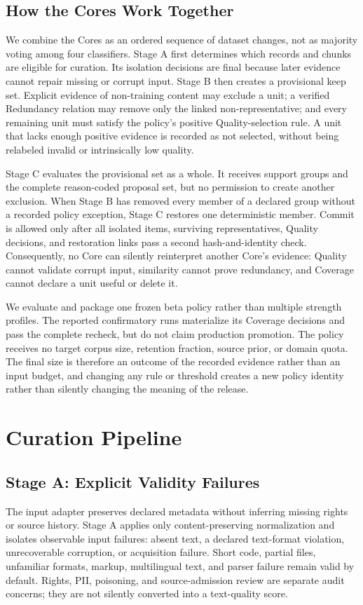 \documentclass[conference]{IEEEtran}
\begin{document}
\subsection{How the Cores Work Together}
We combine the Cores as an ordered sequence of dataset changes, not as majority
voting among four classifiers. Stage A first determines which records and
chunks are eligible for curation. Its isolation decisions are final because
later evidence cannot repair missing or corrupt input. Stage B then creates a
provisional keep set. Explicit evidence of non-training content may exclude a unit;
a verified Redundancy relation may remove only the linked non-representative;
and every remaining unit must satisfy the policy's positive Quality-selection
rule. A unit that lacks enough positive evidence is recorded as not selected,
without being relabeled invalid or intrinsically low quality.

Stage C evaluates the provisional set as a whole. It receives support groups
and the complete reason-coded proposal set, but no permission to create another
exclusion. When Stage B has removed every member of a declared group without a
recorded policy exception, Stage C restores one deterministic member. Commit is
allowed only after all isolated items, surviving representatives, Quality decisions, and
restoration links pass a second hash-and-identity check. Consequently, no Core can
silently reinterpret another Core's evidence: Quality cannot validate corrupt
input, similarity cannot prove redundancy, and Coverage cannot declare a unit
useful or delete it.

We evaluate and package one frozen beta policy rather than multiple strength
profiles. The reported confirmatory runs materialize its Coverage decisions and
pass the complete recheck, but do not claim production promotion. The policy
receives no target corpus size, retention fraction, source prior,
or domain quota. The final size is therefore an outcome of the recorded
evidence rather than an input budget, and changing any rule or threshold creates
a new policy identity rather than silently changing the meaning of the release.

\section{Curation Pipeline}
\subsection{Stage A: Explicit Validity Failures}
The input adapter preserves declared metadata without inferring missing rights
or source history. Stage A applies only content-preserving normalization and
isolates observable input failures: absent text, a declared text-format
violation, unrecoverable corruption, or acquisition failure. Short code,
partial files, unfamiliar formats, markup, multilingual text, and parser
failure remain valid by default. Rights, PII, poisoning, and source-admission
review are separate audit concerns; they are not silently converted into a
text-quality score.
\end{document}
